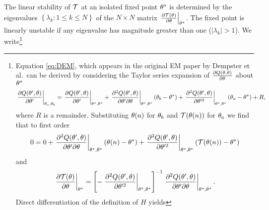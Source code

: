 The linear stability of $\EMmap$ at an isolated fixed point
$\theta^*$ is determined by the eigenvalues
$\left\{\lambda_k:1\leq k \leq N \right\}$ of the $N\times N$ matrix
$\left. \frac{\partial \EMmap(\parameters) }{ \partial \parameters
  }\right|_{\parameters^*}$.  The fixed point is linearly unstable if
any eigenvalue has magnitude greater than one ($\left| \lambda_k
\right| > 1$). We write\footnote{Equation \eqref{eq:DEM}, which
  appears in the original EM paper by Dempster et al.\, can be derived
  by considering the Taylor series expansion of $\frac{\partial
    Q(\theta,\theta)}{\partial \theta}$ about
  $\theta^*$
  \begin{equation*}
    \left. \frac{\partial Q(\parameters',\parameters)}{\partial \parameters'}
    \right|_{\parameters_a,\parameters_b} = \left. \frac{\partial
        Q(\parameters',\parameters)}{\partial \parameters'}
    \right|_{\parameters^*,\parameters^*} %
    + \left. \frac{\partial^2 Q(\parameters',\parameters)}{\partial
        \parameters' \partial \parameters} \right|_{\parameters^*,\parameters^*}
    (\parameters_b -  \parameters^*) %
    + \left. \frac{\partial^2 Q(\parameters',\parameters)}{\partial
        \parameters'^2} \right|_{\parameters^*,\parameters^*}
    (\parameters_a - \parameters^*) + R,
  \end{equation*}
  where $R$ is a remainder.  Substituting ${\theta}{(n)}$ for
  $\theta_b$ and $\EMmap(\ti{\parameters}{n})$ for
  $\theta_a$ we find that to first order
  \begin{equation*}
    0 = 0 + \left. \frac{\partial^2 Q(\parameters',\parameters)}{\partial
        \parameters' \partial \parameters} \right|_{\parameters^*,\parameters^*}
    (\ti{\parameters}{n} - \parameters^*) %
    + \left. \frac{\partial^2 Q(\parameters',\parameters)}{\partial
        \parameters'^2} \right|_{\parameters^*,\parameters^*} (\EMmap(\ti{\parameters}{n}) -
    \parameters^*)
  \end{equation*}
  and
  \begin{equation}
    \label{eq:FN1}
    \left. \frac{ \partial \EMmap(\parameters)}{\partial \parameters} \right|_{\parameters^*} = %
    \left[- \left. \frac{\partial^2 Q(\parameters',\parameters)}{\partial
          \parameters'^2} \right|_{\parameters^*,\parameters^*} \right]^{-1} %
    \left. \frac{\partial^2 Q(\parameters',\parameters)}{\partial
        \parameters' \partial \parameters} \right|_{\parameters^*,\parameters^*}.
  \end{equation}
  Direct differentiation of the definition of $H$ yields
}
